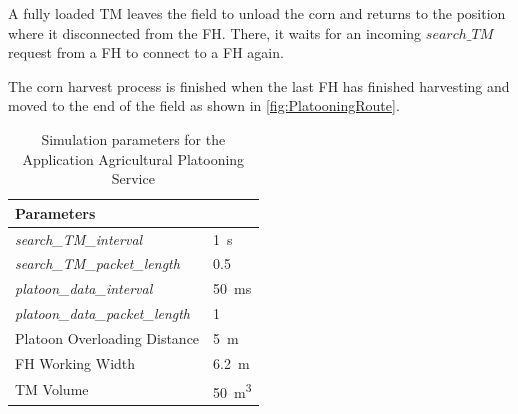 A fully loaded \ac{TM} leaves the field to unload the corn and returns to the position where it disconnected from the \ac{FH}.
There, it waits for an incoming $search\_TM$ request from a \ac{FH} to connect to a \ac{FH} again.

The corn harvest process is finished when the last \ac{FH} has finished harvesting and moved to the end of the field as
shown in \autoref{fig:PlatooningRoute}.

\begin{table}[H]
	\centering
	\begin{tabular}{p{5cm}p{4cm}}
		\toprule
		Parameters & \\
		\midrule
		\textit{search\_TM\_interval} & \SI{1}{\second}\\
		\textit{search\_TM\_packet\_length} & \SI{0.5}{\kilo\byte}\\
		\textit{platoon\_data\_interval} & \SI{50}{\milli\second}\\
		\textit{platoon\_data\_packet\_length} & \SI{1}{\kilo\byte}\\
		Platoon Overloading Distance & \SI{5}{\meter}\\
		\ac{FH} Working Width & \SI{6.2}{\meter}\\
		\ac{TM} Volume & \SI{50}{\cubic\meter}\\
		\bottomrule
	\end{tabular}
	\caption{Simulation parameters for the Application Agricultural Platooning Service}
	\label{tab:SimulationParameters}
\end{table}

